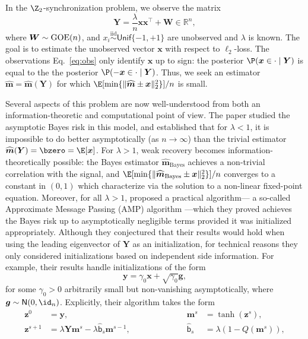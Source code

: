 \documentclass[]{article}
\def\bx{{\boldsymbol x}}
\def\by{{\boldsymbol y}}
\def\bW{{\boldsymbol W}}
\def\normal{{\sf N}}
\def\bz{{\boldsymbol z}}
\def\bg{{\boldsymbol g}}
\def\reals{{\mathbb R}}
\def\bx{{\boldsymbol x}}
\def\by{{\boldsymbol y}}
\def\bW{{\boldsymbol W}}
\def\bz{{\boldsymbol z}}
\def\normal{{\sf N}}
\def\bg{{\boldsymbol g}}
\def\bY{{\boldsymbol Y}}
\def\GOE{{\rm GOE}}
\def\bbm{{\boldsymbol m}}
\def\bmhat{\widehat{\boldsymbol{m}}{}}
\def\sbhat{\widehat{\mathsf{b}}{}}
\def\iid{\stackrel{\mathrm{iid}}\sim}
\begin{document}
In the $\Z_2$-synchronization problem,
we observe the matrix 
\begin{equation}
\label{eq:obs}
    \bY = \frac{\lambda}{n} \bx \bx^\top + \bW  \in \reals^n,
\end{equation}
where $\bW \sim \GOE(n)$, and 
$x_i \iid \mathsf{Unif}\{-1,+1\}$ are unobserved and $\lambda$ is known.
The goal is to estimate the unobserved vector $\bx$ with respect to $\ell_2$-loss.
The observations Eq.~\eqref{eq:obs} only identify $\bx$ up to sign:
the posterior $\P(\bx \in \cdot \mid \bY)$ is 
equal to the the posterior $\P(-\bx \in \cdot \mid \bY)$.
Thus, we seek an estimator $\bmhat = \bmhat(\bY)$ for which $\E[\min\{\| \bmhat \pm \bx \|_2^2\}]/n$ is small.

Several aspects of this problem are now well-understood from both an information-theoretic and computational point of view.
The paper \cite{deshpande2016} studied the asymptotic Bayes risk in this model,
and established that for $\lambda < 1$, 
it is impossible to do better asymptotically (as $n \rightarrow \infty$) than the trivial estimator $\bmhat(\bY) = \bzero = \E[\bx]$.
For $\lambda > 1$, 
weak recovery becomes information-theoretically possible:
the Bayes estimator $\bmhat_{\mathrm{Bayes}}$ achieves a non-trivial correlation with the signal,
and $\E[\min\{\| \bmhat_{\mathrm{Bayes}} \pm \bx \|_2^2\}]/n$ converges to a constant in $(0,1)$ which \cite{deshpande2016} characterize via the solution to a non-linear fixed-point equation.
Moreover, for all $\lambda > 1$, \cite{deshpande2016} proposed a practical algorithm--- a so-called Approximate Message Passing (AMP) algorithm ---which they proved achieves the Bayes risk up to asymptotically negligible terms provided it was initialized appropriately.
Although they conjectured that their results would hold when using the leading eigenvector of $\bY$ as an initialization,
for technical reasons they only considered initializations based on independent side information.
For example,
their results handle initializations of the form
\begin{equation}
\label{eq:init}
    \by = \gamma_0 \bx + \sqrt{\gamma_0} \bg,
\end{equation}
for some $\gamma_0 > 0$ arbitrarily small but non-vanishing asymptotically, 
where $\bg \sim \normal(0,\id_n)$.
Explicitly, their algorithm takes the form
\begin{equation}\label{eq:AMP-FMM}
\begin{aligned}
    \bz^0 &= \by,
    \qquad\qquad\qquad&
    \bbm^s &= \tanh(\bz^s),
    \\
    \bz^{s+1} &= \lambda \bY \bbm^s - \lambda \sbhat_s\bbm^{s-1},
    \qquad\qquad\qquad
    &
    \sbhat_s &= \lambda(1 - Q(\bbm^s)),
\end{aligned}
\end{equation}
\end{document}
